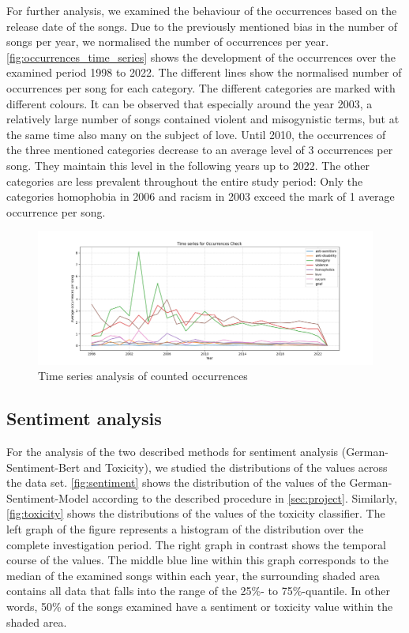 For further analysis, we examined the behaviour of the occurrences based on the release date of the songs. Due to the previously mentioned bias in the number of songs per year, we normalised the number of occurrences per year. \autoref{fig:occurrences_time_series} shows the development of the occurrences over the examined period 1998 to 2022. The different lines show the normalised number of occurrences per song for each category. The different categories are marked with different colours. It can be observed that especially around the year 2003, a relatively large number of songs contained violent and misogynistic terms, but at the same time also many on the subject of love. Until 2010, the occurrences of the three mentioned categories decrease to an average level of 3 occurrences per song. They maintain this level in the following years up to 2022. The other categories are less prevalent throughout the entire study period: Only the categories homophobia in 2006 and racism in 2003 exceed the mark of 1 average occurrence per song.

\begin{figure}[!htb]
    \centering
    \includegraphics[width=\textwidth]{figures/time_series_occurrences.png}
    \caption{Time series analysis of counted occurrences}
    \label{fig:occurrences_time_series}
\end{figure}

\subsection*{Sentiment analysis}

For the analysis of the two described methods for sentiment analysis (German-Sentiment-Bert and Toxicity), we studied the distributions of the values across the data set. \autoref{fig:sentiment} shows the distribution of the values of the German-Sentiment-Model according to the described procedure in \autoref{sec:project}. Similarly, \autoref{fig:toxicity} shows the distributions of the values of the toxicity classifier. The left graph of the figure represents a histogram of the distribution over the complete investigation period. The right graph in contrast shows the temporal course of the values. The middle blue line within this graph corresponds to the median of the examined songs within each year, the surrounding shaded area contains all data that falls into the range of the 25\%- to 75\%-quantile. In other words, 50\% of the songs examined have a sentiment or toxicity value within the shaded area.

